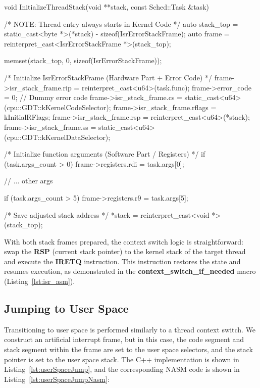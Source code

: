 \documentclass[a4paper,10pt,twoside]{report}
\theoremstyle{definition}
\begin{document}
\begin{cppcode}[caption={Thread stack initialization}, label={lst:threadStack}]
void InitializeThreadStack(void **stack, const Sched::Task &task)
{
    /* NOTE: Thread entry always starts in Kernel Code */
    auto stack_top = static_cast<byte *>(*stack) - sizeof(IsrErrorStackFrame);
    auto frame     = reinterpret_cast<IsrErrorStackFrame *>(stack_top);

    memset(stack_top, 0, sizeof(IsrErrorStackFrame));

    /* Initialize IsrErrorStackFrame (Hardware Part + Error Code) */
    frame->isr_stack_frame.rip    = reinterpret_cast<u64>(task.func);
    frame->error_code             = 0; // Dummy error code
    frame->isr_stack_frame.cs     = static_cast<u64>(cpu::GDT::kKernelCodeSelector);
    frame->isr_stack_frame.rflags = kInitialRFlags;
    frame->isr_stack_frame.rsp    = reinterpret_cast<u64>(*stack);
    frame->isr_stack_frame.ss     = static_cast<u64>(cpu::GDT::kKernelDataSelector);

    /* Initialize function arguments (Software Part / Registers) */
    if (task.args_count > 0) {
        frame->registers.rdi = task.args[0];
    }

    // ... other args

    if (task.args_count > 5) {
        frame->registers.r9 = task.args[5];
    }

    /* Save adjusted stack address */
    *stack = reinterpret_cast<void *>(stack_top);
}
\end{cppcode}

With both stack frames prepared, the context switch logic is straightforward: swap the \textbf{RSP} (current stack pointer) to the kernel stack of the target thread and execute the \textbf{IRETQ} instruction. This instruction restores the state and resumes execution, as demonstrated in the \textbf{context\_switch\_if\_needed} macro (Listing~\ref{lst:isr_asm}).

\subsection{Jumping to User Space}

Transitioning to user space is performed similarly to a thread context switch. We construct an artificial interrupt frame, but in this case, the code segment and stack segment within the frame are set to the user space selectors, and the stack pointer is set to the user space stack. The C++ implementation is shown in Listing~\ref{lst:userSpaceJump}, and the corresponding NASM code is shown in Listing~\ref{lst:userSpaceJumpNasm}:
\end{document}
